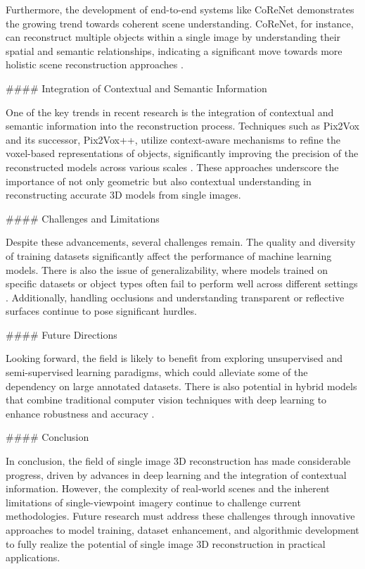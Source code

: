 \documentclass[conference]{IEEEtran}
\begin{document}
Furthermore, the development of end-to-end systems like CoReNet \cite{popov2020} demonstrates the growing trend towards coherent scene understanding. CoReNet, for instance, can reconstruct multiple objects within a single image by understanding their spatial and semantic relationships, indicating a significant move towards more holistic scene reconstruction approaches \cite{popov2020}.

#### Integration of Contextual and Semantic Information

One of the key trends in recent research is the integration of contextual and semantic information into the reconstruction process. Techniques such as Pix2Vox and its successor, Pix2Vox++, utilize context-aware mechanisms to refine the voxel-based representations of objects, significantly improving the precision of the reconstructed models across various scales \cite{xie2019}. These approaches underscore the importance of not only geometric but also contextual understanding in reconstructing accurate 3D models from single images.

#### Challenges and Limitations

Despite these advancements, several challenges remain. The quality and diversity of training datasets significantly affect the performance of machine learning models. There is also the issue of generalizability, where models trained on specific datasets or object types often fail to perform well across different settings \cite{fan2016}. Additionally, handling occlusions and understanding transparent or reflective surfaces continue to pose significant hurdles.

#### Future Directions

Looking forward, the field is likely to benefit from exploring unsupervised and semi-supervised learning paradigms, which could alleviate some of the dependency on large annotated datasets. There is also potential in hybrid models that combine traditional computer vision techniques with deep learning to enhance robustness and accuracy \cite{popov2020}.

#### Conclusion

In conclusion, the field of single image 3D reconstruction has made considerable progress, driven by advances in deep learning and the integration of contextual information. However, the complexity of real-world scenes and the inherent limitations of single-viewpoint imagery continue to challenge current methodologies. Future research must address these challenges through innovative approaches to model training, dataset enhancement, and algorithmic development to fully realize the potential of single image 3D reconstruction in practical applications.
\end{document}
